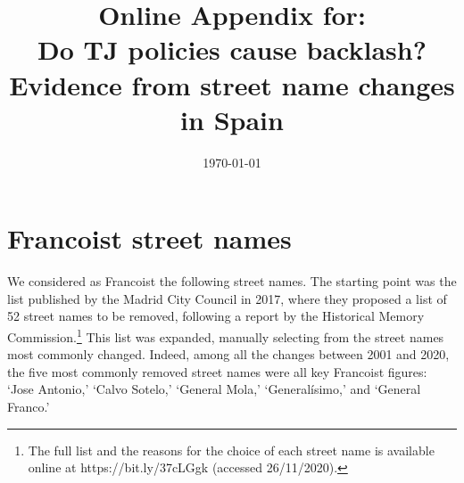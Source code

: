 \documentclass[12pt, titlepage]{article}
\title{\Large Online Appendix for:\\Do TJ policies cause backlash?\\Evidence from street name changes in Spain}
\author{}
\date{\today}
\begin{document}
\maketitle

\tableofcontents

\section{Francoist street names}

We considered as Francoist the following street names. The starting point was the list published by the Madrid City Council in 2017, where they proposed a list of 52 street names to be removed, following a report by the Historical Memory Commission.\footnote{The full list and the reasons for the choice of each street name is available online at https://bit.ly/37cLGgk (accessed 26/11/2020).}
This list was expanded, manually selecting from the street names most commonly changed.
Indeed, among all the changes between 2001 and 2020, the five most commonly removed street names were all key Francoist figures: `Jose Antonio,' `Calvo Sotelo,' `General Mola,' `Generalísimo,' and `General Franco.'
\end{document}

